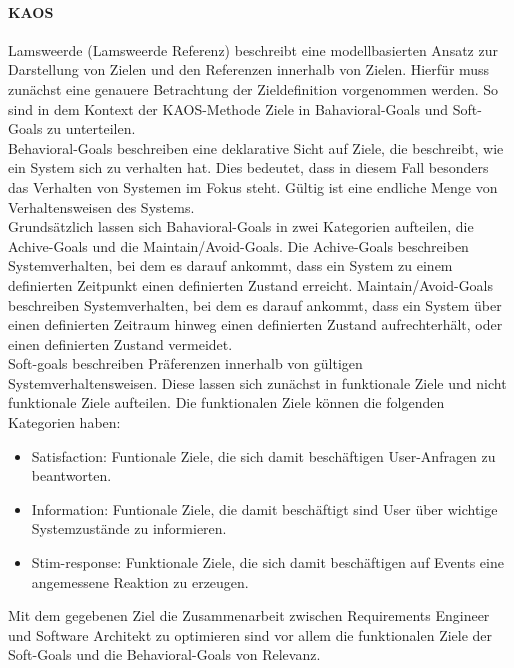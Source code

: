 \paragraph{KAOS}
Lamsweerde (Lamsweerde Referenz) beschreibt eine modellbasierten Ansatz zur Darstellung von Zielen und den Referenzen innerhalb von Zielen. Hierf\"ur muss zun\"achst eine genauere Betrachtung der Zieldefinition vorgenommen werden. So sind in dem Kontext der KAOS-Methode Ziele in Bahavioral-Goals und Soft-Goals zu unterteilen. \\

Behavioral-Goals beschreiben eine deklarative Sicht auf Ziele, die beschreibt, wie ein System sich zu verhalten hat. Dies bedeutet, dass in diesem Fall besonders das Verhalten von Systemen im Fokus steht. G\"ultig ist eine endliche Menge von Verhaltensweisen des Systems. \\

Grunds\"atzlich lassen sich Bahavioral-Goals in zwei Kategorien aufteilen, die Achive-Goals und die Maintain/Avoid-Goals. Die Achive-Goals beschreiben Systemverhalten, bei dem es darauf ankommt, dass ein System zu einem definierten Zeitpunkt einen definierten Zustand erreicht. Maintain/Avoid-Goals beschreiben Systemverhalten, bei dem es darauf ankommt, dass ein System \"uber einen definierten Zeitraum hinweg einen definierten Zustand aufrechterh\"alt, oder einen definierten Zustand vermeidet.\\

Soft-goals beschreiben Pr\"aferenzen innerhalb von g\"ultigen Systemverhaltensweisen. Diese lassen sich zun\"achst in funktionale Ziele und nicht funktionale Ziele aufteilen. Die funktionalen Ziele k\"onnen die folgenden Kategorien haben:
\begin{itemize}
\item Satisfaction: Funtionale Ziele, die sich damit besch\"aftigen User-Anfragen zu beantworten.
\item Information: Funtionale Ziele, die damit besch\"aftigt sind User \"uber wichtige Systemzust\"ande zu informieren.
\item Stim-response: Funktionale Ziele, die sich damit besch\"aftigen auf Events eine angemessene Reaktion zu erzeugen.
\end{itemize}
Mit dem gegebenen Ziel die Zusammenarbeit zwischen Requirements Engineer und Software Architekt zu optimieren sind vor allem die funktionalen Ziele der Soft-Goals und die Behavioral-Goals von Relevanz.\\

